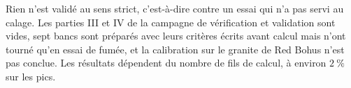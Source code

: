 Rien n'est validé au sens strict, c'est-à-dire contre un essai qui n'a pas servi au calage. Les parties III et IV de la campagne de vérification et validation sont vides, sept bancs sont préparés avec leurs critères écrits avant calcul mais n'ont tourné qu'en essai de fumée, et la calibration sur le granite de Red Bohus n'est pas conclue. Les résultats dépendent du nombre de fils de calcul, à environ $2~\%$ sur les pics.
\clearpage
